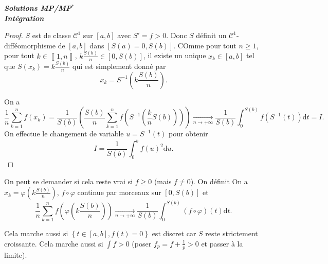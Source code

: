 \documentclass[12pt]{article}
\begin{document}
\begin{titlepage}
	\centering
	\vspace*{\fill}
	\Huge \textit{\textbf{Solutions MP/MP$^*$\\ Intégration}}
	\vspace*{\fill}
\end{titlepage}

\begin{proof}
    $S$ est de classe $\mathcal{C}^{1}$ sur $[a,b]$ avec $S'=f>0$. Donc $S$ définit un $\mathcal{C}^{1}$-difféomorphisme de $[a,b]$ dans $[S(a)=0,S(b)]$. COmme pour tout $n\geqslant1$, pour tout $k\in\left\llbracket1,n\right\rrbracket$, $k\frac{S(b)}{n}\in[0,S(b)]$, il existe un unique $x_{k}\in[a,b]$ tel que $S(x_{k})=k\frac{S(b)}{n}$ qui est simplement donné par 
    \begin{equation}
        \boxed{
            x_{k}=S^{-1}\left(k\frac{S(b)}{n}\right).
        }
    \end{equation}

    On a 
    \begin{equation}
        \frac{1}{n}\sum_{k=1}^{n}f(x_{k})=\frac{1}{S(b)}\left(\frac{S(b)}{n}\sum_{k=1}^{n}f\left(S^{-1}\left(\frac{k}{n}S(b)\right)\right)\right)\xrightarrow[n\to+\infty]{}\frac{1}{S(b)}\int_{0}^{S(b)}f\left(S^{-1}(t)\right)\mathrm{d}t=I.
    \end{equation}
    On effectue le changement de variable $u=S^{-1}(t)$ pour obtenir
    \begin{equation}
        \boxed{
            I=\frac{1}{S(b)}\int_{0}^{b}f(u)^{2}\mathrm{d}u.
        }
    \end{equation}
\end{proof}

\begin{remark}
    On peut se demander si cela reste vrai si $f\geqslant0$ (mais $f\neq 0$). On définit 
    On a $x_{k}=\varphi\left(k\frac{S(b)}{n}\right)$, $f\circ \varphi$ continue par morceaux sur $[0,S(b)]$ et 
    \begin{equation}
        \frac{1}{n}\sum_{k=1}^{n}f\left(\varphi\left(k\frac{S(b)}{n}\right)\right)\xrightarrow[n\to+\infty]{}\frac{1}{S(b)}\int_{0}^{S(b)}\left(f\circ \varphi\right)(t)\mathrm{d}t.
    \end{equation}

    Cela marche aussi si $\left\lbrace t\in[a,b], f(t)=0\right\rbrace$ est discret car $S$ reste strictement croissante. Cela marche aussi si $\int f>0$ (poser $f_p=f+\frac{1}{p}>0$ et passer à la limite).
\end{remark}
\end{document}
